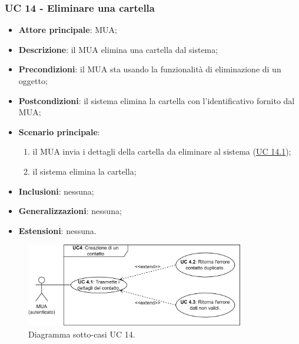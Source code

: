 \subsubsection{UC 14 - Eliminare una cartella} \label{sec:UC14}
    \begin{itemize}
        \item \textbf{Attore principale}: MUA;
        \item \textbf{Descrizione}: il MUA elimina una cartella dal sistema;
        \item \textbf{Precondizioni}: il MUA sta usando la funzionalità di eliminazione di un oggetto;
        \item \textbf{Postcondizioni}: il sistema elimina la cartella con l'identificativo fornito dal MUA;
        \item \textbf{Scenario principale}:
            \begin{enumerate}
                \item il MUA invia i dettagli della cartella da eliminare al sistema (\hyperref[sec:UC14.1]{UC 14.1});
                \item il sistema elimina la cartella;
            \end{enumerate}
        \item \textbf{Inclusioni}: nessuna;
        \item \textbf{Generalizzazioni}: nessuna;
        \item \textbf{Estensioni}: nessuna.
    \end{itemize}

\begin{figure}[h]
    \includegraphics[width=0.85\textwidth]{sections/uc_imgs/UC04.X.png}
    \centering
    \caption{Diagramma sotto-casi UC 14.}
\end{figure}

